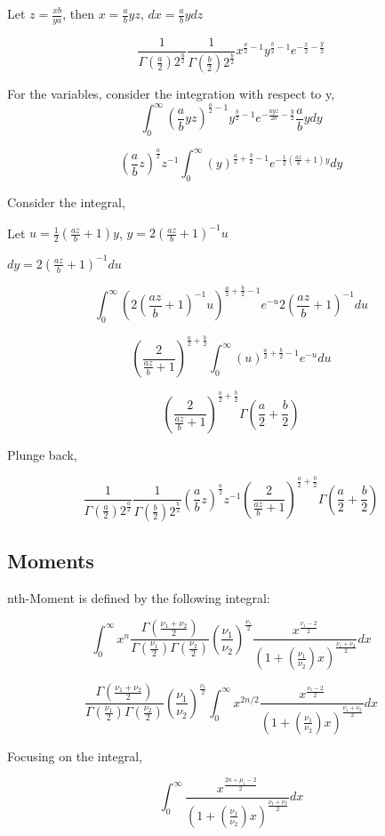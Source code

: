 \documentclass{article}
\begin{document}
Let $z = \frac{xb}{ya}$, then $x = \frac{a}{b} yz$, $dx = \frac{a}{b} ydz$

$$\frac{1}{\Gamma(\frac{a}2)2^{\frac{a}2}} \frac{1}{\Gamma(\frac{b}2)2^{\frac{b}2}} x ^{\frac{a}2-1} y^{\frac{b}2-1}e^{-\frac{x}2-\frac{y}{2}} $$

For the variables, consider the integration with respect to y,
$$\int_{0}^{\infty}{(\frac{a}{b} yz)^{\frac{a}2-1} y^{\frac{b}2-1}e^{-\frac{ayz}{2b}-\frac{y}{2}} \frac{a}{b}ydy}$$

$$(\frac{a}{b} z)^{\frac{a}2} z^{-1} \int_{0}^{\infty}{( y)^{\frac{a}2+\frac{b}2-1}e^{-\frac{1}{2}{(\frac{az}{b}+1)}y} dy}$$

Consider the integral, 

Let $u = \frac{1}{2}{(\frac{az}{b}+1)}y$, $y = 2(\frac{az}{b}+1)^{-1}u $

$dy = 2(\frac{az}{b}+1)^{-1}du$

$$\int_{0}^{\infty}{(2(\frac{az}{b}+1)^{-1}u)^{\frac{a}2+\frac{b}2-1}e^{-u} 2(\frac{az}{b}+1)^{-1}du}$$

$$(\frac{2}{\frac{az}{b}+1})^{\frac{a}2+\frac{b}2}\int_{0}^{\infty}{(u)^{\frac{a}2+\frac{b}2-1}e^{-u} du}$$

$$(\frac{2}{\frac{az}{b}+1})^{\frac{a}2+\frac{b}2}\Gamma(\frac{a}2+\frac{b}2)$$

Plunge back,

$$\frac{1}{\Gamma(\frac{a}2)2^{\frac{a}2}} \frac{1}{\Gamma(\frac{b}2)2^{\frac{b}2}} (\frac{a}{b} z)^{\frac{a}2} z^{-1}(\frac{2}{\frac{az}{b}+1})^{\frac{a}2+\frac{b}2}\Gamma(\frac{a}2+\frac{b}2)$$


\subsection{Moments}
nth-Moment is defined by the following integral:

$$\int_{0}^{\infty}x^n\frac{\Gamma(\frac{\nu_1+\nu_2}{2})}{\Gamma(\frac{\nu_1}{2})\Gamma(\frac{\nu_2}{2})} (\frac{\nu_1}{\nu_2})^{\frac{\nu_1}{2}} \frac{x^{\frac{\nu_1-2}{2}}}{(1+(\frac{\nu_1}{\nu_2})x)^{\frac{\nu_1+\nu_2}{2}}}dx$$

$$\frac{\Gamma(\frac{\nu_1+\nu_2}{2})}{\Gamma(\frac{\nu_1}{2})\Gamma(\frac{\nu_2}{2})} (\frac{\nu_1}{\nu_2})^{\frac{\nu_1}{2}}\int_{0}^{\infty}x^{2n/2} \frac{x^{\frac{\nu_1-2}{2}}}{(1+(\frac{\nu_1}{\nu_2})x)^{\frac{\nu_1+\nu_2}{2}}}dx$$

Focusing on the integral,

$$\int_{0}^{\infty} \frac{x^{\frac{2n+\mu_1-2}{2}}}{(1+(\frac{\nu_1}{\nu_2})x)^{\frac{\nu_1+\nu_2}{2}}}dx$$
\end{document}
